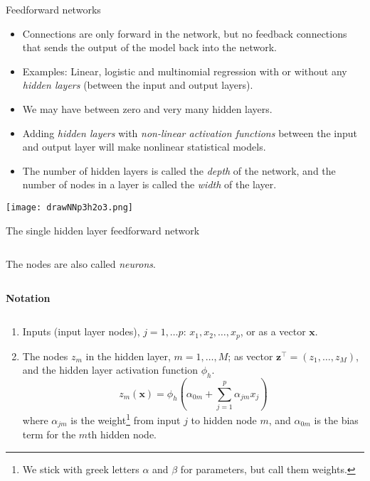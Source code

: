 \documentclass[10pt,ignorenonframetext,]{beamer}
\providecommand{\tightlist}{%
  \setlength{\itemsep}{0pt}\setlength{\parskip}{0pt}}
\begin{document}
\begin{frame}{Feedforward networks}
\protect\hypertarget{feedforward-networks}{}

\begin{itemize}
\item
  Connections are only forward in the network, but no feedback
  connections that sends the output of the model back into the network.
\item
  Examples: Linear, logistic and multinomial regression with or without
  any \emph{hidden layers} (between the input and output layers).
\item
  We may have between zero and very many hidden layers.
\item
  Adding \emph{hidden layers} with \emph{non-linear activation
  functions} between the input and output layer will make nonlinear
  statistical models.
\item
  The number of hidden layers is called the \emph{depth} of the network,
  and the number of nodes in a layer is called the \emph{width} of the
  layer.
\end{itemize}

\end{frame}

\begin{frame}

\centering

\texttt{[image: drawNNp3h2o3.png]}

\end{frame}

\begin{frame}

\begin{block}{The single hidden layer feedforward network}

\(~\)

The nodes are also called \emph{neurons}.

\(~\)

\textbf{Notation}

\(~\)

\begin{enumerate}
\tightlist
\item
  Inputs (input layer nodes), \(j=1,\dots p\):
  \(x_1, x_2, \ldots, x_p\), or as a vector \({\boldsymbol x}\).
\item
  The nodes \(z_m\) in the hidden layer, \(m=1,\ldots, M\); as vector
  \({\boldsymbol z}^\top=(z_1, \ldots, z_M)\), and the hidden layer
  activation function \(\phi_h\). \[
  z_m({\boldsymbol x})=\phi_h(\alpha_{0m}+\sum_{j=1}^p \alpha_{jm}x_{j})
  \] where \(\alpha_{jm}\) is the
  weight\footnote{We stick with greek letters $\alpha$ and $\beta$ for parameters, but call them weights.}
  from input \(j\) to hidden node \(m\), and \(\alpha_{0m}\) is the bias
  term for the \(m\)th hidden node.
\end{enumerate}

\end{block}

\end{frame}
\end{document}
